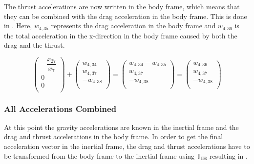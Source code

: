 \noindent
The thrust accelerations are now written in the body frame, which means that they can be combined with the drag acceleration in the body frame. This is done in . Here, $w_{4,35}$ represents the drag acceleration in the body frame and $w_{4,36}$ is the total acceleration in the x-direction in the body frame caused by both the drag and the thrust.


\begin{equation} \label{eq:DandTBody}
\begin{pmatrix}
-\dfrac{x_{27}}{x_{7}}\\
0\\
0\\
\end{pmatrix}
+
\begin{pmatrix}
w_{4,34}\\
w_{4,37}\\
-w_{4,38}\\
\end{pmatrix}
=
\begin{pmatrix}
w_{4,34}-w_{4,35}\\
w_{4,37}\\
-w_{4,38}\\
\end{pmatrix}
=
\begin{pmatrix}
w_{4,36}\\
w_{4,37}\\
-w_{4,38}\\
\end{pmatrix}
\end{equation}

\subsubsection{All Accelerations Combined}
\label{subsubsec:allAcc}
At this point the gravity accelerations are known in the inertial frame and the drag and thrust accelerations in the body frame. In order to get the final acceleration vector in the inertial frame, the drag and thrust accelerations have to be transformed from the body frame to the inertial frame using $\mathbb{T}_{\mathbf{IB}}$ resulting in .



